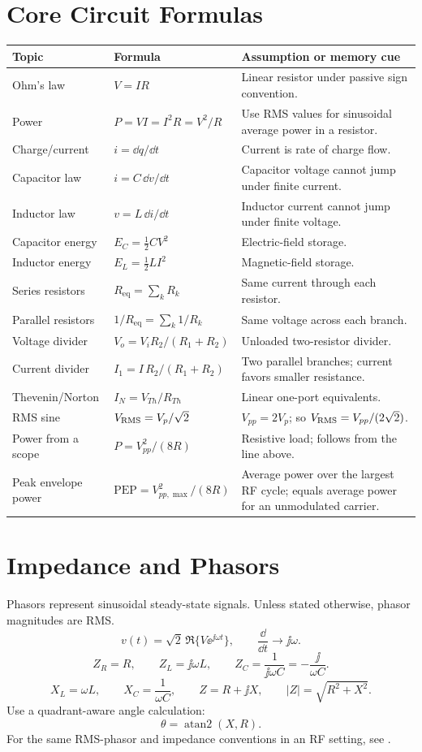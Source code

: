 \section{Core Circuit Formulas}
\begin{longtable}{@{}L{0.25\textwidth}L{0.32\textwidth}L{0.34\textwidth}@{}}
\toprule
Topic & Formula & Assumption or memory cue \\
\midrule
\endhead
Ohm's law & \(V=IR\) & Linear resistor under passive sign convention. \\
Power & \(P=VI=I^2R=V^2/R\) & Use RMS values for sinusoidal average power in a resistor. \\
Charge/current & \(i=\dd q/\dd t\) & Current is rate of charge flow. \\
Capacitor law & \(i=C\,\dd v/\dd t\) & Capacitor voltage cannot jump under finite current. \\
Inductor law & \(v=L\,\dd i/\dd t\) & Inductor current cannot jump under finite voltage. \\
Capacitor energy & \(E_C=\frac{1}{2}CV^2\) & Electric-field storage. \\
Inductor energy & \(E_L=\frac{1}{2}LI^2\) & Magnetic-field storage. \\
Series resistors & \(R_{\mathrm{eq}}=\sum_k R_k\) & Same current through each resistor. \\
Parallel resistors & \(1/R_{\mathrm{eq}}=\sum_k 1/R_k\) & Same voltage across each branch. \\
Voltage divider & \(V_o=V_i R_2/(R_1+R_2)\) & Unloaded two-resistor divider. \\
Current divider & \(I_1=I\,R_2/(R_1+R_2)\) & Two parallel branches; current favors smaller resistance. \\
Thevenin/Norton & \(I_N=V_{Th}/R_{Th}\) & Linear one-port equivalents. \\
RMS sine & \(V_{\mathrm{RMS}}=V_p/\sqrt{2}\) & \(V_{pp}=2V_p\); so \(V_{\mathrm{RMS}}=V_{pp}/(2\sqrt2)\). \\
Power from a scope & \(P=V_{pp}^2/(8R)\) & Resistive load; follows from the line above. \\
Peak envelope power & \(\mathrm{PEP}=V_{pp,\max}^2/(8R)\) & Average power over the largest RF cycle; equals average power for an unmodulated carrier. \\
\bottomrule
\end{longtable}

\section{Impedance and Phasors}
Phasors represent sinusoidal steady-state signals. Unless stated otherwise,
phasor magnitudes are RMS.
\[
v(t)=\sqrt{2}\,\Re\{V\ee^{\jj\omega t}\},
\qquad
\frac{\dd}{\dd t}\longrightarrow \jj\omega .
\]
\[
Z_R=R,\qquad Z_L=\jj\omega L,\qquad
Z_C=\frac{1}{\jj\omega C}=-\frac{\jj}{\omega C}.
\]
\[
X_L=\omega L,\qquad X_C=\frac{1}{\omega C},\qquad
Z=R+\jj X,\qquad |Z|=\sqrt{R^2+X^2}.
\]
Use a quadrant-aware angle calculation:
\[
\theta=\operatorname{atan2}(X,R).
\]
For the same RMS-phasor and impedance conventions in an RF setting, see
\cite[pp.~22--29]{white2004highfrequency}.

